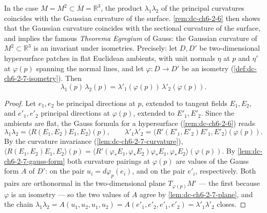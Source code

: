 \begin{remark}
  \label{rem:dc-ch6-2-7}
  \leanok
  In the case $M=M^2\subset\overline{M}=\mathbb{R}^3$, the product $\lambda_1\lambda_2$
  of the principal curvatures coincides with the Gaussian curvature of the surface.
  \cref{rem:dc-ch6-2-6} then shows that the Gaussian curvature coincides with the sectional
  curvature of the surface, and implies the famous \emph{Theorema Egregium} of Gauss:
  the Gaussian curvature of $M^2\subset\mathbb{R}^3$ is an invariant under
  isometries. Precisely: let $D,D'$ be two-dimensional hypersurface patches in
  flat Euclidean ambients, with unit normals $\eta$ at $p$ and $\eta'$ at
  $\varphi(p)$ spanning the normal lines, and let $\varphi:D\to D'$ be an
  isometry (\cref{def:dc-ch6-2-7-isometry}). Then
  $$
  \lambda_1(p)\,\lambda_2(p)=\lambda'_1(\varphi(p))\,\lambda'_2(\varphi(p)).
  $$
\end{remark}
\begin{proof}
  \leanok
  Let $e_1,e_2$ be principal directions at $p$, extended to tangent fields
  $E_1,E_2$, and $e'_1,e'_2$ principal directions at $\varphi(p)$, extended to
  $E'_1,E'_2$. Since the ambients are flat, the Gauss formula for a
  hypersurface (\cref{rem:dc-ch6-2-6}) reads
  $$
  \lambda_1\lambda_2=\langle R(E_1,E_2)E_1,E_2\rangle(p),
  \qquad
  \lambda'_1\lambda'_2=\langle R'(E'_1,E'_2)E'_1,E'_2\rangle(\varphi(p)).
  $$
  By the curvature invariance (\cref{lem:dc-ch6-2-7-curvature}),
  $\langle R(E_1,E_2)E_1,E_2\rangle(p)
    =\langle R'(\varphi_*E_1,\varphi_*E_2)\varphi_*E_1,\varphi_*E_2\rangle(\varphi(p))$.
  By \cref{lem:dc-ch6-2-7-gauss-form} both curvature pairings at
  $\varphi(p)$ are values of the Gauss form $A$ of $D'$: on the pair
  $u_i=d\varphi_p(e_i)$, and on the pair $e'_i$, respectively. Both pairs are
  orthonormal in the two-dimensional plane $T_{\varphi(p)}M'$ — the first
  because $\varphi$ is an isometry — so the two values of $A$ agree by
  \cref{lem:dc-ch6-2-7-plane}, and the chain
  $\lambda_1\lambda_2
    =A(u_1,u_2,u_1,u_2)=A(e'_1,e'_2,e'_1,e'_2)=\lambda'_1\lambda'_2$
  closes.
\end{proof}

